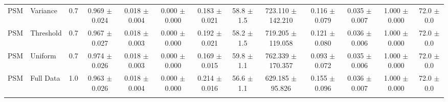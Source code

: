 \begin{table}[p]
{\begin{tabular}{@{}llccccccccccc@{}}
PSM & Variance & 0.7 & 0.969 $\pm$ 0.024 & 0.018 $\pm$ 0.004 & 0.000 $\pm$ 0.000 & 0.183 $\pm$ 0.021 & 58.8 $\pm$ 1.5 & 723.110 $\pm$ 142.210 & 0.116 $\pm$ 0.079 & 0.035 $\pm$ 0.007 & 1.000 $\pm$ 0.000 & 72.0 $\pm$ 0.0 \\
PSM & Threshold & 0.7 & 0.967 $\pm$ 0.027 & 0.018 $\pm$ 0.003 & 0.000 $\pm$ 0.000 & 0.192 $\pm$ 0.021 & 58.2 $\pm$ 1.5 & 719.205 $\pm$ 119.058 & 0.121 $\pm$ 0.080 & 0.036 $\pm$ 0.006 & 1.000 $\pm$ 0.000 & 72.0 $\pm$ 0.0 \\
PSM & Uniform & 0.7 & 0.974 $\pm$ 0.026 & 0.018 $\pm$ 0.003 & 0.000 $\pm$ 0.000 & 0.169 $\pm$ 0.015 & 59.8 $\pm$ 1.1 & 762.339 $\pm$ 170.357 & 0.093 $\pm$ 0.072 & 0.035 $\pm$ 0.006 & 1.000 $\pm$ 0.000 & 72.0 $\pm$ 0.0 \\
PSM & Full Data & 1.0 & 0.963 $\pm$ 0.026 & 0.018 $\pm$ 0.004 & 0.000 $\pm$ 0.000 & 0.214 $\pm$ 0.016 & 56.6 $\pm$ 1.1 & 629.185 $\pm$ 95.826 & 0.155 $\pm$ 0.096 & 0.036 $\pm$ 0.007 & 1.000 $\pm$ 0.000 & 72.0 $\pm$ 0.0 \\
\addlinespace
\bottomrule
\end{tabular}%
}
\label{supp-det-psm-fixed_full_data}
\end{table}
